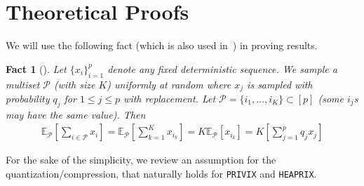 \documentclass[sigconf, anonymous, review]{acmart}
\newcommand{\todo}[1]{\textcolor{red}{ToDo:~#1}}
\newtheorem{theorem}{Theorem}
\newtheorem{fact}[theorem]{Fact}
\begin{document}




 




\section{Theoretical Proofs}\label{app:proofs}



We will use the following fact (which is also used in~\cite{li2019convergence,haddadpour2019convergence}) in proving results.
\begin{fact}[\citep{li2019convergence,haddadpour2019convergence}]\label{fact:1}
Let
$\{x_i\}_{i=1}^p$ denote any fixed deterministic sequence. We sample a multiset $\mathcal{P}$ (with size $K$) uniformly at random where $x_j$ is sampled  with probability $q_j$ for $1\leq j\leq p$ with replacement.  Let $\mathcal{P} = \{i_1,\ldots, i_K\} \subset[p]$ (some $i_j$s may have the same value). Then
\begin{align}
    \mathbb{E}_{\mathcal{P}}\left[\sum_{i\in \mathcal{P}}x_i\right]=\mathbb{E}_{\mathcal{P}}\left[\sum_{k=1}^Kx_{i_k}\right]=K\mathbb{E}_{\mathcal{P}}\left[x_{i_k}\right]=K\left[\sum_{j=1}^pq_jx_j\right]
\end{align}
\end{fact}
For the sake of the simplicity, we review an assumption for the quantization/compression, that naturally holds for \texttt{PRIVIX} and \texttt{HEAPRIX}.
\end{document}
